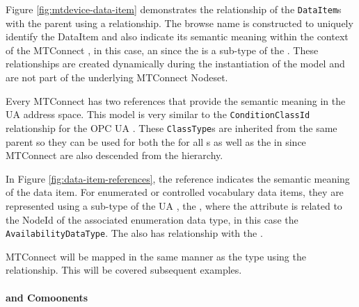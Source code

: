 

Figure \ref{fig:mtdevice-data-item} demonstrates the relationship of the \texttt{Data\-Item}s with the parent  using a  relationship. The browse name is constructed to uniquely identify the DataItem and also indicate its semantic meaning within the context of the MTConnect , in this case, an  since the  is a sub-type of the . These relationships are created dynamically during the instantiation of the model and are not part of the underlying MTConnect Nodeset.

Every MTConnect  has two references that provide the semantic meaning in the UA address space. This model is very similar to the \texttt{Condition\-Class\-Id} relationship for the OPC UA . These \texttt{Class\-Type}s are inherited from the same parent so they can be used for both the  for all s as well as the  in  since MTConnect  are also descended from the  hierarchy.



In Figure \ref{fig:data-item-references}, the  reference indicates the semantic meaning of the data item. For enumerated or controlled vocabulary data items, they are represented using a sub-type of the UA , the , where the  attribute is related to the NodeId of the associated enumeration data type, in this case the \texttt{Availability\-Data\-Type}. The  also has  relationship with the  .

MTConnect  will be mapped in the same manner as the type using the  relationship. This will be covered subsequent examples.

\FloatBarrier

\paragraph{ and  Comoonents}

